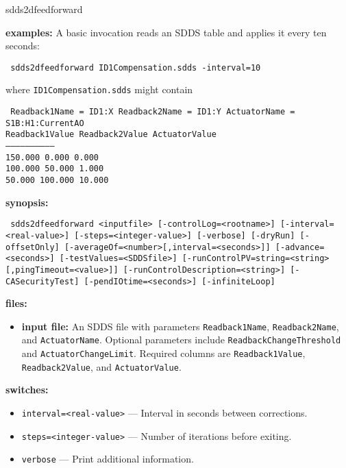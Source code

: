 \begin{sddsprog}{sdds2dfeedforward}
\item \textbf{examples:}
A basic invocation reads an SDDS table and applies it every ten seconds:
\begin{flushleft}{\tt
sdds2dfeedforward ID1Compensation.sdds -interval=10
}\end{flushleft}
where \verb+ID1Compensation.sdds+ might contain
\begin{flushleft}{\tt
Readback1Name = ID1:X \quad Readback2Name = ID1:Y \quad ActuatorName = S1B:H1:CurrentAO\\
 Readback1Value  Readback2Value  ActuatorValue\\
------------------------------\\
       150.000       0.000          0.000\\
       100.000      50.000          1.000\\
        50.000     100.000         10.000\\
}\end{flushleft}
\item \textbf{synopsis:}
\begin{flushleft}{\tt
sdds2dfeedforward <inputfile>\
       [-controlLog=<rootname>]\
       [-interval=<real-value>] [-steps=<integer-value>]\
       [-verbose] [-dryRun] [-offsetOnly]\
       [-averageOf=<number>[,interval=<seconds>]]\
       [-advance=<seconds>]\
       [-testValues=<SDDSfile>]\
       [-runControlPV=string=<string>[,pingTimeout=<value>]]\
       [-runControlDescription=<string>]\
       [-CASecurityTest]\
       [-pendIOtime=<seconds>] [-infiniteLoop]
}\end{flushleft}
\item \textbf{files:}
\begin{itemize}
  \item \textbf{input file:} An SDDS file with parameters \verb+Readback1Name+,
  \verb+Readback2Name+, and \verb+ActuatorName+.  Optional parameters include
  \verb+ReadbackChangeThreshold+ and \verb+ActuatorChangeLimit+.  Required
  columns are \verb+Readback1Value+, \verb+Readback2Value+, and
  \verb+ActuatorValue+.
\end{itemize}
\item \textbf{switches:}
    \begin{itemize}
        \item {\tt interval=<real-value>} --- Interval in seconds between corrections.
        \item {\tt steps=<integer-value>} --- Number of iterations before exiting.
        \item {\tt verbose} --- Print additional information.

\end{itemize}
\end{sddsprog}
